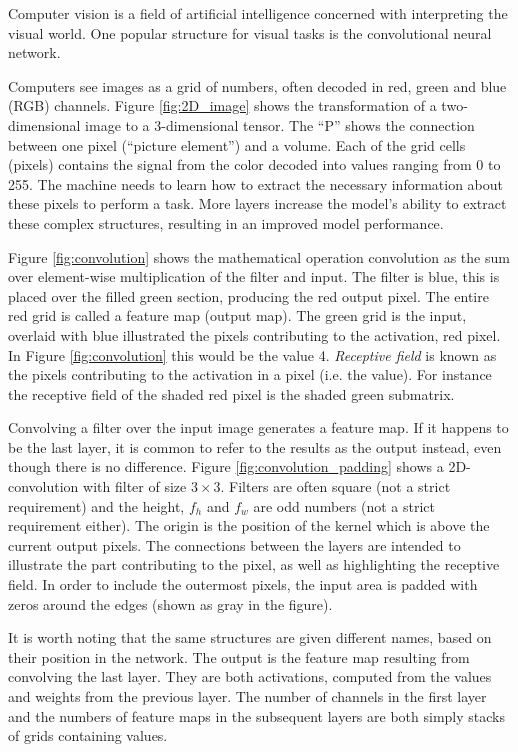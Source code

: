 \documentclass{article}
\begin{document}
Computer vision is a field of artificial intelligence concerned with interpreting the visual world. One popular structure for visual tasks is the convolutional neural network. %

Computers see images as a grid of numbers, often decoded in red, green and blue (RGB) channels. Figure \ref{fig:2D_image} shows the transformation of a two-dimensional image to a 3-dimensional tensor. The ``P'' shows the connection between one pixel (``picture element'') and a volume. Each of the grid cells (pixels) contains the signal from the color decoded into values ranging from 0 to 255. The machine needs to learn how to extract the necessary information about these pixels to perform a task. More layers increase the model's ability to extract these complex structures, resulting in an improved model performance. 


Figure \ref{fig:convolution} shows the mathematical operation convolution as the sum over element-wise multiplication of the filter and input. The filter is blue, this is placed over the filled green section, producing the red output pixel. The entire red grid is called a feature map (output map). The green grid is the input, overlaid with blue illustrated the pixels contributing to the activation, red pixel. In Figure \ref{fig:convolution} this would be the value 4. \textit{Receptive field} is known as the pixels contributing to the activation in a pixel (i.e. the value). For instance the receptive field of the shaded red pixel is the shaded green submatrix.


Convolving a filter over the input image generates a feature map. If it happens to be the last layer, it is common to refer to the results as the output instead, even though there is no difference. Figure \ref{fig:convolution_padding} shows a 2D-convolution with filter of size $3\times 3$. Filters are often square (not a strict requirement) and the height, $f_h$ and $f_w$ are odd numbers (not a strict requirement either). The origin is the position of the kernel which is above the current output pixels. The connections between the layers are intended to illustrate the part contributing to the pixel, as well as highlighting the receptive field. In order to include the outermost pixels, the input area is padded with zeros around the edges (shown as gray in the figure). 

It is worth noting that the same structures are given different names, based on their position in the network. The output is the feature map resulting from convolving the last layer. They are both activations, computed from the values and weights from the previous layer. The number of channels in the first layer and the numbers of feature maps in the subsequent layers are both simply stacks of grids containing values.
\end{document}
